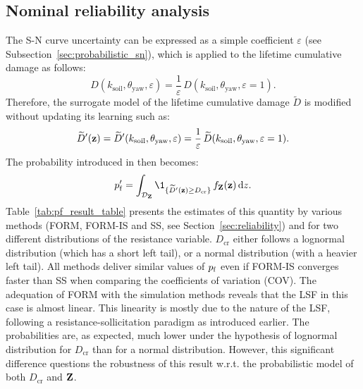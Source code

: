 \subsection{Nominal reliability analysis}\label{sec:owt_ra}
The S-N curve uncertainty can be expressed as a simple coefficient $\varepsilon$ (see Subsection~\ref{sec:probabilistic_sn}), which is applied to the lifetime cumulative damage as follows: 
\begin{equation}
    D(k_{\mathrm{soil}}, \theta_{\mathrm{yaw}}, \varepsilon) = \frac{1}{\varepsilon} \, D(k_{\mathrm{soil}}, \theta_{\mathrm{yaw}}, \varepsilon=1).
\end{equation}
Therefore, the surrogate model of the lifetime cumulative damage $\widetilde{D}$ is modified without updating its learning such as:
\begin{equation}
    \widetilde{D}'({\bf z}) = \widetilde{D}'(k_{\mathrm{soil}}, \theta_{\mathrm{yaw}}, \varepsilon) = \frac1\varepsilon \, \widetilde{D}(k_{\mathrm{soil}}, \theta_{\mathrm{yaw}}, \varepsilon=1).
\end{equation} 
The probability introduced in  then becomes: 
\begin{equation}
    \pf' = \int_{\iD_\bZ} \1_{\{\widetilde{D}'(\bz) \geq D_{\mathrm{cr}}\}} \, f_\bZ(\bz) \, \dd z.
    \label{eq:owt_pf_surrogate}
\end{equation}
Table~\ref{tab:pf_result_table} presents the estimates of this quantity by various methods (FORM, FORM-IS and SS, see Section~\ref{sec:reliability}) and for two different distributions of the resistance variable. 
$D_{\mathrm{cr}}$ either follows a lognormal distribution (which has a short left tail), or a normal distribution (with a heavier left tail). 
All methods deliver similar values of $p_\mathrm{f}$ even if FORM-IS converges faster than SS when comparing the coefficients of variation (COV). 
The adequation of FORM with the simulation methods reveals that the LSF in this case is almost linear. 
This linearity is mostly due to the nature of the LSF, following a resistance-sollicitation paradigm as introduced earlier. 
The probabilities are, as expected, much lower under the hypothesis of lognormal distribution for $D_{\mathrm{cr}}$ than for a normal distribution. 
However, this significant difference questions the robustness of this result w.r.t. the probabilistic model of both $D_{\mathrm{cr}}$ and ${\bf Z}$.  

